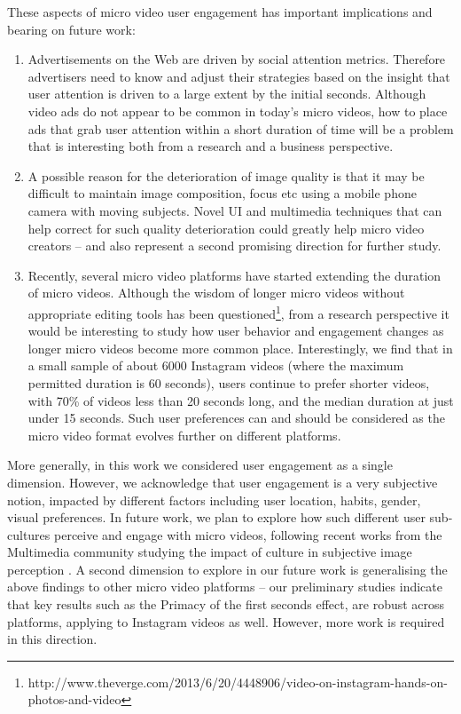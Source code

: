 These aspects of micro video user engagement has important implications and bearing on future work: 
\begin{enumerate}
    \item Advertisements on the Web are driven by social attention metrics. Therefore advertisers need to know and adjust their strategies based on the insight that user attention is driven to a large extent by the initial seconds. Although  video ads do not appear to be common in today's micro videos, how to place ads that grab user attention within a short duration of time will be a problem that is interesting both from a research and a business perspective. 
    \item A possible reason for the deterioration of image quality is that it may be difficult to maintain image composition, focus etc using a mobile phone camera with moving subjects. Novel UI and multimedia techniques that can help correct for such quality deterioration could greatly help micro video creators -- and also represent a second promising direction for further study. 
    \item Recently, several micro video platforms have started extending the duration of micro videos. Although the wisdom of longer micro videos without appropriate editing tools has been questioned\footnote{\scriptsize http://www.theverge.com/2013/6/20/4448906/video-on-instagram-hands-on-photos-and-video}, from a research perspective it would be interesting to study how user behavior and engagement changes as longer micro videos become more common place. Interestingly, we find that in a small sample of about 6000 Instagram videos (where the maximum permitted duration is 60 seconds), users continue to prefer shorter videos, with 70\% of videos less than 20 seconds long, and the median duration at just under 15 seconds. Such user preferences can and should be considered as the micro video format evolves further on different platforms.
\end{enumerate}

More generally, in this work we considered user engagement as a single dimension. However, we acknowledge that user engagement is a very subjective notion, impacted by different factors including user location, habits, gender, visual preferences. In  future work, we plan to explore how such different user sub-cultures perceive and engage with micro videos, following recent works from the Multimedia community studying the impact of culture in subjective image perception \cite{jou2015visual}. A second dimension to explore in our future work is generalising the above findings to other micro video platforms -- our preliminary studies indicate that key results such as the Primacy of the first seconds effect, are robust across platforms, applying to Instagram videos as well. However, more work is required in this direction.





